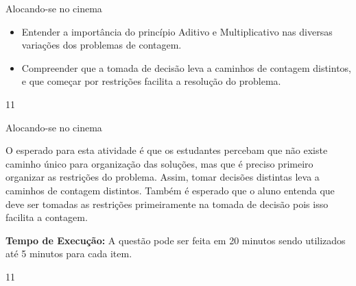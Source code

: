 \begin{objectives}{Alocando-se no cinema}
{
\begin{itemize}
\item Entender a importância do princípio Aditivo e Multiplicativo nas diversas variações dos problemas de contagem. 
\item Compreender que a tomada de decisão leva a caminhos de contagem distintos, e que começar por restrições facilita a resolução do problema. 
\end{itemize}
}{1}{1}
\end{objectives}
\begin{sugestions}{Alocando-se no cinema}
{
O esperado para esta atividade é que os estudantes percebam que não existe caminho único para organização das soluções, mas que é preciso primeiro organizar as restrições do problema. Assim, tomar decisões distintas leva a  caminhos de contagem distintos. Também é esperado que o aluno entenda que deve ser tomadas as restrições primeiramente na tomada de decisão pois isso facilita a contagem.

\textbf{Tempo de Execução:} A questão pode ser feita em 20 minutos sendo utilizados até 5 minutos para cada item. 
}{1}{1}
\end{sugestions}
